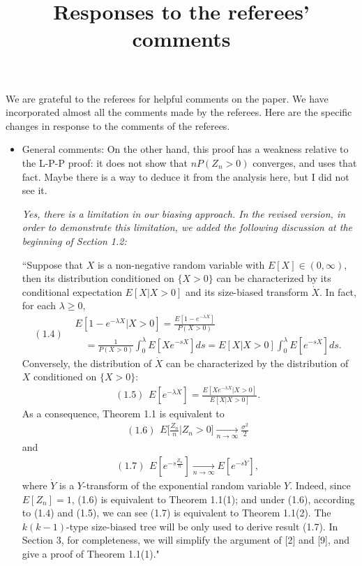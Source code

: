 \documentclass[12pt,a4paper]{amsart}
\title[Responses]{\large Responses to the referees' comments}
\numberwithin{equation}{section}
\begin{document}
\maketitle	
	We are grateful to the referees for helpful comments on the paper.
	We have incorporated almost all the comments made by the referees.
	Here are the specific changes in response to the comments of the referees.
\\
\begin{itemize}
\item
	General comments: On the other hand, this proof has a weakness relative to the L-P-P proof: it does not show that $n P(Z_n > 0)$ converges, and uses that fact. 
	Maybe there is a way to deduce it from the analysis here, but I did not see it.
	
	{\it Yes, there is a limitation in our biasing approach. 
	In the revised version, in order to demonstrate this limitation, we added the following discussion at the beginning of Section 1.2:
	
	``Suppose that $X$ is a non-negative 
	random variable with $E[X] \in (0,\infty)$,
	then its distribution conditioned on $\{ X > 0\}$ can be characterized by its conditional expectation $E[X|X>0]$ and its size-biased transform $\dot X$.
	In fact, for each $\lambda \geq 0$,
	\begin{equation*}
	(1.4)
	\begin{split}
	&E[1-e^{-\lambda X}|X>0]
	= \frac{E[1-e^{-\lambda X}]}{P(X>0)}
	\\&\quad = \frac{1}{P(X>0)}\int_0^\lambda E[Xe^{-s X}]ds = E[X|X>0]\int_0^\lambda E[e^{-s \dot X}]ds.
	\end{split}
	\end{equation*}
	Conversely, the distribution of $\dot X$ can be characterized 
	by the distribution of $X$ conditioned on $\{ X > 0\}$: 
	\begin{equation*}
	(1.5)
\begin{split}
	E[e^{- \lambda \dot X}] 
	= \frac{E[Xe^{-\lambda X}| X>0]}{E[X| X>0]}.
	\end{split}
	\end{equation*}
	As a consequence,  
	Theorem 1.1	is equivalent to
	\begin{equation*}
	(1.6)
	\begin{split}
	E\big[\frac{Z_n}{n}| Z_n > 0\big]
	\xrightarrow[n\to \infty]{} \frac{\sigma^2}{2}
	\end{split}
	\end{equation*}
	and
	\[
	(1.7) 
	\begin{split}
	\label{eq: convergence after size-biased}
	E[e^{-s \frac{\dot Z_n}{n}}]
	\xrightarrow[n\to \infty]{} E[e^{-s \dot Y}],
	\end{split}
	\]
	where $\dot Y$ is a $Y$-transform 
	of the exponential random variable $Y$.
	Indeed, since $E[Z_n] = 1$, (1.6) is equivalent to Theorem 1.1(1); and under (1.6), according to (1.4) and (1.5), we can see (1.7) is equivalent to Theorem 1.1(2).
	The $k(k-1)$-type size-biased tree will be only used to derive result (1.7).
	In Section 3, for completeness, we will simplify 
	the argument of [2] and [9],
	and give a proof of Theorem 1.1(1)."
}
	

\end{itemize}
\end{document}
